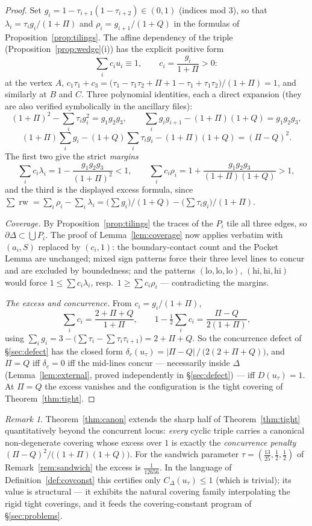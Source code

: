 \documentclass[11pt,reqno]{amsart}
\theoremstyle{plain}
\theoremstyle{definition}
\theoremstyle{remark}
\newtheorem{remark}[theorem]{Remark}
\newcommand{\rw}{\operatorname{rw}}
\begin{document}
\begin{proof}
Set $g_i=1-\tau_{i+1}(1-\tau_{i+2})\in(0,1)$ (indices mod $3$), so that
$\lambda_i=\tau_ig_i/(1+\Pi)$ and $\rho_i=g_{i+1}/(1+Q)$ in the formulas of
Proposition~\ref{prop:tilings}. The affine dependency of the triple
(Proposition~\ref{prop:wedge}(i)) has the explicit positive form
\[
\sum_ic_iu_i\equiv1,\qquad c_i=\frac{g_i}{1+\Pi}>0 :
\]
at the vertex $A$, $c_1\tau_1+c_3
=\bigl(\tau_1-\tau_1\tau_2+\Pi+1-\tau_1+\tau_1\tau_2\bigr)/(1+\Pi)=1$, and
similarly at $B$ and $C$. Three polynomial identities, each a direct
expansion (they are also verified symbolically in the ancillary files):
\[
(1+\Pi)^2-\sum_i\tau_ig_i^2=g_1g_2g_3,\qquad
\sum_ig_ig_{i+1}-(1+\Pi)(1+Q)=g_1g_2g_3,
\]
\[
(1+\Pi)\sum_ig_i-(1+Q)\sum_i\tau_ig_i-(1+\Pi)(1+Q)=(\Pi-Q)^2 .
\]
The first two give the strict \emph{margins}
\[
\sum_ic_i\lambda_i=1-\frac{g_1g_2g_3}{(1+\Pi)^2}<1,\qquad
\sum_ic_i\rho_i=1+\frac{g_1g_2g_3}{(1+\Pi)(1+Q)}>1,
\]
and the third is the displayed excess formula, since
$\sum\rw=\sum_i\rho_i-\sum_i\lambda_i
=\bigl(\sum g_i\bigr)/(1+Q)-\bigl(\sum\tau_ig_i\bigr)/(1+\Pi)$.

\emph{Coverage.} By Proposition~\ref{prop:tilings} the traces of the $P_i$
tile all three edges, so $\partial\Delta\subset\bigcup P_i$. The proof of
Lemma~\ref{lem:coverage} now applies verbatim with $(a_i,S)$ replaced by
$(c_i,1)$: the boundary-contact count and the Pocket Lemma are unchanged;
mixed sign patterns force their three level lines to concur and are excluded
by boundedness; and the patterns
$(\mathrm{lo},\mathrm{lo},\mathrm{lo})$, $(\mathrm{hi},\mathrm{hi},\mathrm{hi})$
would force $1\le\sum c_i\lambda_i$, resp.\ $1\ge\sum c_i\rho_i$ ---
contradicting the margins.

\emph{The excess and concurrence.} From $c_i=g_i/(1+\Pi)$,
\[
\textstyle\sum_ic_i=\frac{2+\Pi+Q}{1+\Pi},\qquad
1-\tfrac12\sum_ic_i=\frac{\Pi-Q}{2(1+\Pi)},
\]
using $\sum_ig_i=3-\bigl(\sum\tau_i-\sum\tau_i\tau_{i+1}\bigr)=2+\Pi+Q$. So
the concurrence defect of \S\ref{sec:defect} has the closed form
$\delta_c(u_\tau)=|\Pi-Q|\,/\,\bigl(2(2+\Pi+Q)\bigr)$, and $\Pi=Q$ iff
$\delta_c=0$ iff the mid-lines concur --- necessarily inside $\Delta$
(Lemma~\ref{lem:external}, proved independently in \S\ref{sec:defect}) ---
iff $D(u_\tau)=1$. At $\Pi=Q$ the excess vanishes and the configuration is
the tight covering of Theorem~\ref{thm:tight}.
\end{proof}

\begin{remark}\label{rem:canon}
Theorem~\ref{thm:canon} extends the sharp half of Theorem~\ref{thm:tight}
quantitatively beyond the concurrent locus: \emph{every} cyclic triple
carries a canonical non-degenerate covering whose excess over $1$ is exactly
the \emph{concurrence penalty} $(\Pi-Q)^2/\bigl((1+\Pi)(1+Q)\bigr)$. For the
sandwich parameter $\tau=(\tfrac{13}{25},\tfrac12,\tfrac12)$ of
Remark~\ref{rem:sandwich} the excess is $\tfrac1{12656}$. In the language of
Definition~\ref{def:covconst} this certifies only $C_\Delta(u_\tau)\le1$
(which is trivial); its value is structural --- it exhibits the natural
covering family interpolating the rigid tight coverings, and it feeds the
covering-constant program of \S\ref{sec:problems}.
\end{remark}
\end{document}
